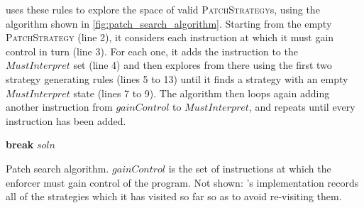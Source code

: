  {\Technique} uses these rules to explore the space of
valid \textsc{PatchStrategy}s, using the algorithm shown in
\autoref{fig:patch_search_algorithm}.  Starting from the empty
\textsc{PatchStrategy} (line 2), it considers each instruction at
which it must gain control in turn (line 3).  For each one, it adds
the instruction to the $\mathit{MustInterpret}$ set (line 4) and then
explores from there using the first two strategy generating rules
(lines 5 to 13) until it finds a strategy with an empty
$\mathit{MustInterpret}$ state (lines 7 to 9).  The algorithm then
loops again adding another instruction from $\mathit{gainControl}$ to
$\mathit{MustInterpret}$, and repeats until every instruction has been
added.

\begin{sanefig}
  \begin{algorithmic}[1]
      \While {\true}
          \State \textbf{break}
        \Else
        \EndIf
      \EndWhile
    \EndFor
    \State \Return $\mathit{soln}$
    \EndProcedure
  \end{algorithmic}
  \caption{Patch search algorithm.  $\mathit{gainControl}$ is the set
    of instructions at which the enforcer must gain control of the
    program.  Not shown: {\implementation}'s implementation records
    all of the strategies which it has visited so far so as to avoid
    re-visiting them.}
  \label{fig:patch_search_algorithm}
\end{sanefig}

